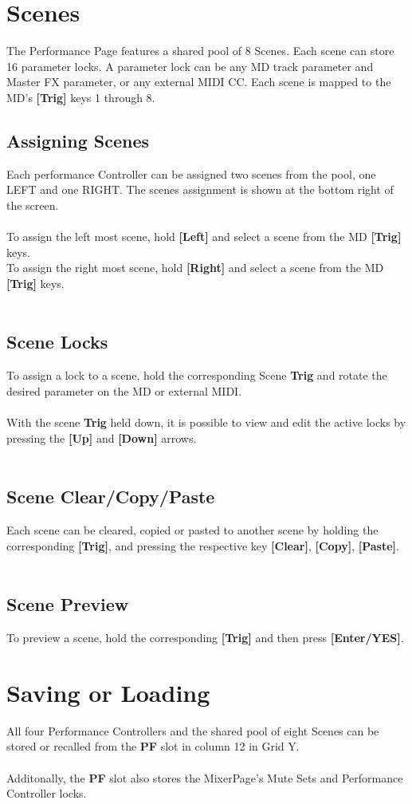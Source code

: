 \section{Scenes}
The Performance Page features a shared pool of 8 Scenes. Each scene can store 16 parameter locks. A parameter lock can be any MD track parameter and Master FX parameter, or any external MIDI CC. Each scene is mapped to the MD's \textbf{[Trig]} keys 1 through 8.\\
\subsection{Assigning Scenes}
Each performance Controller can be assigned two scenes from the pool, one LEFT and one RIGHT. The scenes assignment is shown at the bottom right of the screen.\\\\
To assign the left most scene, hold \textbf{[Left]} and select a scene from the MD \textbf{[Trig]} keys.\\
To assign the right most scene, hold \textbf{[Right]} and select a scene from the MD \textbf{[Trig]} keys.\\\\
\subsection{Scene Locks}

To assign a lock to a scene, hold the corresponding Scene \textbf{Trig} and rotate the desired parameter on the MD or external MIDI.\\\\
With the scene \textbf{Trig} held down, it is possible to view and edit the active locks by pressing the \textbf{[Up]} and \textbf{[Down]} arrows.
\\\\
\subsection{Scene Clear/Copy/Paste}
Each scene can be cleared, copied or pasted to another scene by holding the corresponding \textbf{[Trig]}, and pressing the respective key \textbf{[Clear]}, \textbf{[Copy]}, \textbf{[Paste]}.\\\\
\subsection{Scene Preview}
To preview a scene, hold the corresponding \textbf{[Trig]} and then press \textbf{[Enter/YES]}.
\section{Saving or Loading}
All four Performance Controllers and the shared pool of eight Scenes can be stored or recalled from the \textbf{PF} slot in column 12 in Grid Y.\\\\
Additonally, the \textbf{PF} slot also stores the MixerPage's Mute Sets and Performance Controller locks.
